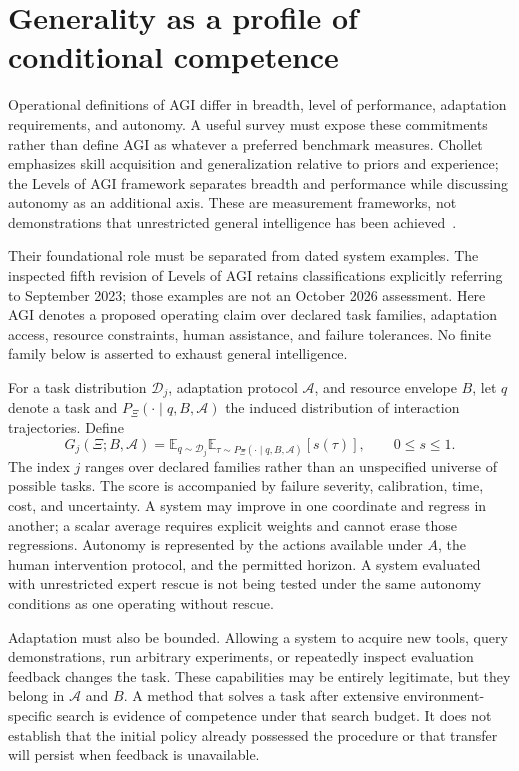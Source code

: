 \section{Generality as a profile of conditional competence}\label{sec:C01:03}
Operational definitions of AGI differ in breadth, level of performance, adaptation requirements, and autonomy. A useful survey must expose these commitments rather than define AGI as whatever a preferred benchmark measures. Chollet emphasizes skill acquisition and generalization relative to priors and experience; the Levels of AGI framework separates breadth and performance while discussing autonomy as an additional axis. These are measurement frameworks, not demonstrations that unrestricted general intelligence has been achieved~\cite{chollet2019intelligence,morris2023agilevels}.

Their foundational role must be separated from dated system examples. The inspected fifth revision of Levels of AGI retains classifications explicitly referring to September 2023; those examples are not an October 2026 assessment. Here AGI denotes a proposed operating claim over declared task families, adaptation access, resource constraints, human assistance, and failure tolerances. No finite family below is asserted to exhaust general intelligence.

For a task distribution $\mathcal D_j$, adaptation protocol $\mathcal A$, and resource envelope $B$, let $q$ denote a task and $P_{\Xi}(\cdot\mid q,B,\mathcal A)$ the induced distribution of interaction trajectories. Define
\begin{equation}
 G_j(\Xi;B,\mathcal A)=
 \mathbb E_{q\sim\mathcal D_j}
 \mathbb E_{\tau\sim P_{\Xi}(\cdot\mid q,B,\mathcal A)}
 [s(\tau)],\qquad 0\leq s\leq1.
\end{equation}
The index $j$ ranges over declared families rather than an unspecified universe of possible tasks. The score is accompanied by failure severity, calibration, time, cost, and uncertainty. A system may improve in one coordinate and regress in another; a scalar average requires explicit weights and cannot erase those regressions. Autonomy is represented by the actions available under $A$, the human intervention protocol, and the permitted horizon. A system evaluated with unrestricted expert rescue is not being tested under the same autonomy conditions as one operating without rescue.

Adaptation must also be bounded. Allowing a system to acquire new tools, query demonstrations, run arbitrary experiments, or repeatedly inspect evaluation feedback changes the task. These capabilities may be entirely legitimate, but they belong in $\mathcal A$ and $B$. A method that solves a task after extensive environment-specific search is evidence of competence under that search budget. It does not establish that the initial policy already possessed the procedure or that transfer will persist when feedback is unavailable.

